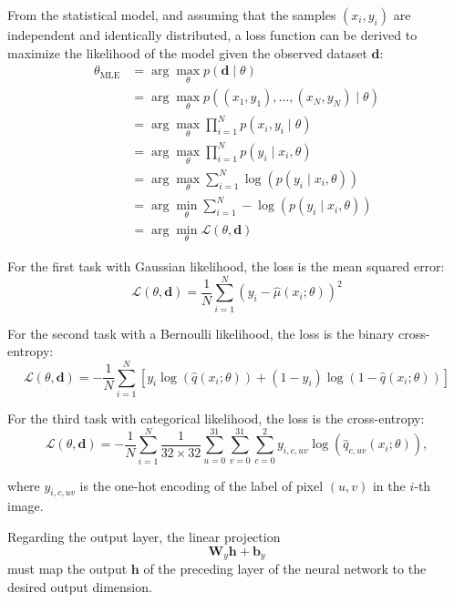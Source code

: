 \documentclass[11pt, a4paper]{exam}
\begin{document}
\begin{exercises}
\begin{parts}
\begin{solution}
        From the statistical model, and assuming that the samples $(x_i,y_i)$ are independent and identically distributed, a loss function can be derived to maximize the likelihood of the model given the observed dataset $\mathbf{d}$:
        \begin{align*}
            \theta_{\text{MLE}} &= \arg \max_\theta p(\mathbf{d} \mid \theta) \\
            &= \arg \max_\theta p((x_1, y_1), \ldots, (x_N, y_N) \mid \theta) \\
            &= \arg \max _\theta \prod_{i=1}^{N} p(x_i, y_i \mid \theta ) \\
            &= \arg \max _\theta \prod_{i=1}^{N} p(y_i \mid x_i, \theta ) \\
            &= \arg \max _\theta \sum_{i=1}^{N} \log (p(y_i \mid x_i, \theta )) \\
            &= \arg \min _\theta \sum_{i=1}^{N} -\log (p(y_i \mid x_i, \theta )) \\
            &= \arg \min_\theta \mathcal{L}(\theta,\mathbf{d})
        \end{align*}

        For the first task with Gaussian likelihood, the loss is the mean squared error:
        \[
            \mathcal{L}(\theta,\mathbf{d}) = \frac{1}{N} \sum_{i=1}^{N} (y_i - \hat \mu (x_i ; \theta))^2
        \]

        For the second task with a Bernoulli likelihood, the loss is the binary cross-entropy:
        \[
            \mathcal{L}(\theta,\mathbf{d}) = -\frac{1}{N} \sum_{i=1}^{N} \left[ y_i \log(\hat q(x_i; \theta)) + (1-y_i)\log (1- \hat q(x_i;\theta)) \right]
        \]

        For the third task with categorical likelihood, the loss is the cross-entropy:
        \[
            \mathcal{L}(\theta,\mathbf{d}) = -\frac{1}{N} \sum_{i=1}^{N} \frac{1}{32 \times 32}\sum_{u=0}^{31} \sum_{v=0}^{31}\sum_{c=0}^2 y_{i, c, uv} \log(\hat q_{c,uv}(x_i; \theta)),
        \]

        where $y_{i,c,uv}$ is the one-hot encoding of the label of pixel $(u, v)$ in the $i$-th image.

        Regarding the output layer, the linear projection
        \[
            \mathbf{W}_y \mathbf{h} + \mathbf{b}_y
        \]
        must map the output $\mathbf{h}$ of the preceding layer of the neural network to the desired output dimension.


\end{solution}
\end{parts}
\end{exercises}
\end{document}
